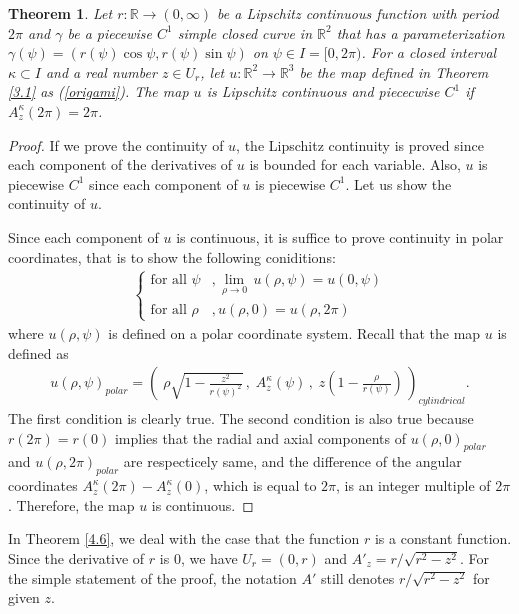 \documentclass{amsart}
\theoremstyle{plain}
\newtheorem{theorem}{Theorem}[section]
\theoremstyle{definition}
\theoremstyle{remark}
\begin{document}
\begin{theorem}\label{4.5} %
Let $r:\mathbb{R}\to(0,\infty)$ be a Lipschitz continuous function with period $2\pi$ and $\gamma$ be a piecewise $C^1$ simple closed curve in $\mathbb{R}^2$ that has a parameterization $\gamma(\psi)=(r(\psi)\cos\psi,r(\psi)\sin\psi)$ on $\psi\in I=[0,2\pi)$. 
For a closed interval $\kappa\subset I$ and a real number $z\in U_r$, let $u:\mathbb{R}^2\to\mathbb{R}^3$ be the map defined in Theorem \ref{3.1} as (\ref{origami}).
The map $u$ is Lipschitz continuous and piececwise $C^1$ if $A_z^{\kappa}(2\pi)=2\pi$.
\end{theorem}

\begin{proof}
If we prove the continuity of $u$, the Lipschitz continuity is proved since each component of the derivatives of $u$ is bounded for each variable.
Also, $u$ is piecewise $C^1$ since each component of $u$ is piecewise $C^1$.
Let us show the continuity of $u$.

Since each component of $u$ is continuous, it is suffice to prove continuity in polar coordinates, that is to show the following coniditions:
\begin{align*}
\begin{cases}
\text{for all $\psi$}&,\displaystyle{\lim_{\rho\to0}}\,u(\rho,\psi)=u(0,\psi) \\
\text{for all $\rho$}&,u(\rho,0)=u(\rho,2\pi)
\end{cases}
\end{align*}
where $u(\rho,\psi)$ is defined on a polar coordinate system.
Recall that the map $u$ is defined as
\begin{align*}
u(\rho,\psi)_{polar}=\left(\;\rho\sqrt{1-\frac{z^2}{r(\psi)^2}}\,,
\;A_z^{\kappa}(\psi)\,,
\;z\left(1-\frac{\rho}{r(\psi)}\right)\,\right)_{cylindrical}.
\end{align*}
The first condition is clearly true.
The second condition is also true because $r(2\pi)=r(0)$ implies that the radial and axial components of $u(\rho,0)_{polar}$ and $u(\rho,2\pi)_{polar}$ are respecticely same, and the difference of the angular coordinates $A_z^{\kappa}(2\pi)-A_z^{\kappa}(0)$, which is equal to $2\pi$, is an integer multiple of $2\pi$.
Therefore, the map $u$ is continuous.
\end{proof}




In Theorem \ref{4.6}, we deal with the case that the function $r$ is a constant function.
Since the derivative of $r$ is $0$, we have $U_r=(0,r)$ and $A'_z=r/\sqrt{r^2-z^2}$.
For the simple statement of the proof, the notation $A'$ still denotes $r/\sqrt{r^2-z^2}$ for given $z$.
\end{document}
